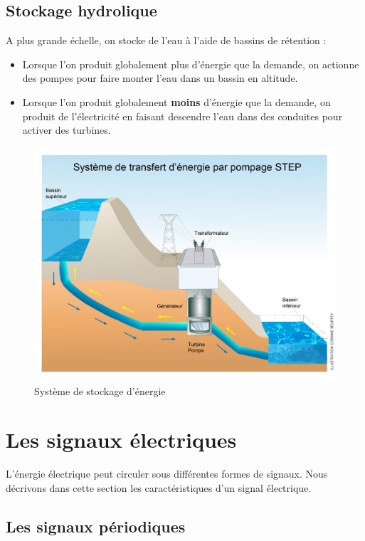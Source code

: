 \documentclass[10pt,fleqn]{article} %
\begin{document}
    \subsection{Stockage hydrolique}
    
    A plus grande échelle, on stocke de l'eau à l'aide de bassins de rétention : 
    \begin{itemize}
        \item Lorsque l'on produit globalement plus d'énergie que la demande, on actionne des pompes pour faire monter l'eau dans un bassin en altitude. 
        \item Lorsque l'on produit globalement \textbf{moins} d'énergie que la demande, on produit de l'électricité en faisant descendre l'eau dans des conduites pour activer des turbines. 
    \end{itemize}
    
    \begin{figure}[h]
        \centering
        \includegraphics[width=\textwidth]{images/hydrau}
        \caption{Système de stockage d'énergie}
        \label{fig:hydrau}
    \end{figure}
    
    
    \section{Les signaux électriques}
    L'énergie électrique peut circuler sous différentes formes de signaux. Nous décrivons dans cette section les caractéristiques d'un signal électrique. 
    
    \subsection{Les signaux périodiques}
    
\end{document}
